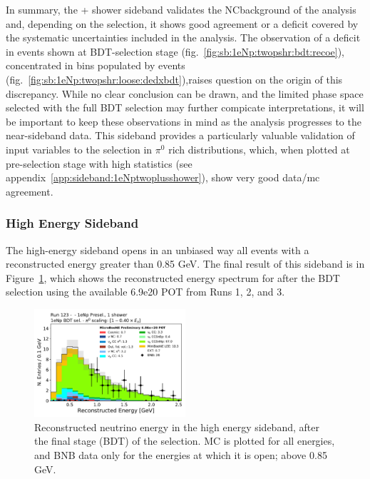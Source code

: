 In summary, the + shower sideband validates the NC\pizero background of the analysis and, depending on the selection, it shows good agreement or a deficit covered by the systematic uncertainties included in the analysis. The observation of a deficit in events shown at BDT-selection stage (fig.~\ref{fig:sb:1eNp:twopshr:bdt:recoe}), concentrated in bins populated by \nue events (fig.~\ref{fig:sb:1eNp:twopshr:loose:dedxbdt}),raises question on the origin of this discrepancy. While no clear conclusion can be drawn, and the limited phase space selected with the full BDT selection may further compicate interpretations, it will be important to keep these observations in mind as the analysis progresses to the near-sideband data. This sideband provides a particularly valuable validation of input variables to the \nue selection in $\pi^0$ rich distributions, which, when plotted at pre-selection stage with high statistics (see appendix~\ref{app:sideband:1eNptwoplusshower}), show very good data/mc agreement.

\subsubsection{High Energy Sideband}
\label{sec:sideband:1eNp:he}
The high-energy sideband opens in an unbiased way all events with a reconstructed energy greater than 0.85 GeV. The final result of this sideband is in Figure~\ref{fig:HE_1eNp_reco_e}, which shows the reconstructed energy spectrum for \npsel after the BDT selection using the available 6.9e20 POT from Runs 1, 2, and 3.
\begin{figure}[H]
    \begin{center}
    \includegraphics[width=0.5\textwidth]{Sidebands/Figures/1eNp/HighEnergy/reco_e.pdf}
    \caption{Reconstructed neutrino energy in the high energy sideband, after the final stage (BDT) of the \npsel selection. MC is plotted for all energies, and BNB data only for the energies at which it is open; above 0.85 GeV.}
    \label{fig:HE_1eNp_reco_e}
    \end{center}
\end{figure}

